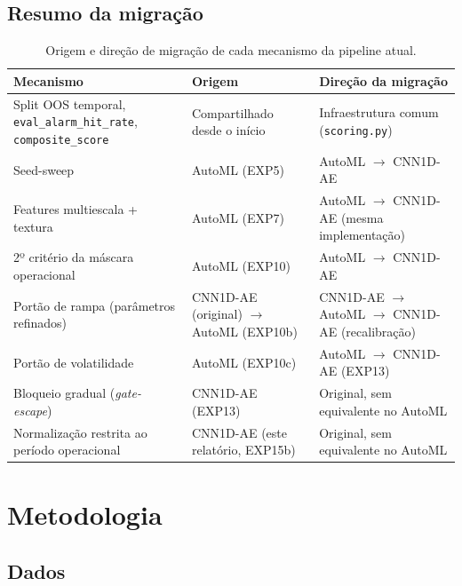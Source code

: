 \documentclass[11pt,a4paper]{article}
\begin{document}
\subsection{Resumo da migração}

\begin{table}[H]
\centering
\small
\begin{tabular}{@{}p{4.1cm}p{3.4cm}p{5.7cm}@{}}
\toprule
\textbf{Mecanismo} & \textbf{Origem} & \textbf{Direção da migração} \\
\midrule
Split OOS temporal, \texttt{eval\_alarm\_hit\_rate}, \texttt{composite\_score} & Compartilhado desde o início & Infraestrutura comum (\texttt{scoring.py}) \\
Seed-sweep & AutoML (EXP5) & AutoML $\to$ CNN1D-AE \\
Features multiescala + textura & AutoML (EXP7) & AutoML $\to$ CNN1D-AE (mesma implementação) \\
2º critério da máscara operacional & AutoML (EXP10) & AutoML $\to$ CNN1D-AE \\
Portão de rampa (parâmetros refinados) & CNN1D-AE (original) $\to$ AutoML (EXP10b) & CNN1D-AE $\to$ AutoML $\to$ CNN1D-AE (recalibração) \\
Portão de volatilidade & AutoML (EXP10c) & AutoML $\to$ CNN1D-AE (EXP13) \\
Bloqueio gradual (\emph{gate-escape}) & CNN1D-AE (EXP13) & Original, sem equivalente no AutoML \\
Normalização restrita ao período operacional & CNN1D-AE (este relatório, EXP15b) & Original, sem equivalente no AutoML \\
\bottomrule
\end{tabular}
\caption{Origem e direção de migração de cada mecanismo da pipeline atual.}
\end{table}

\section{Metodologia}
\label{sec:metodologia}

\subsection{Dados}
\end{document}
